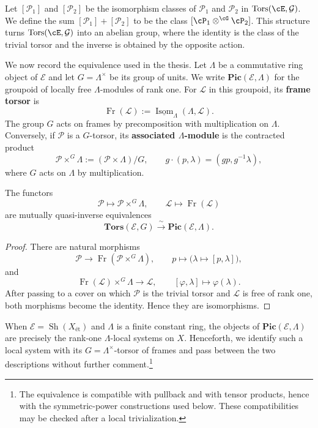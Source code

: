 Let $[\mathcal{P}_1]$ and $[\mathcal{P}_2]$ be the isomorphism classes of $\mathcal{P}_1$ and $\mathcal{P}_2$ in $\mathrm{Tors}(\cE, \mathcal{G})$.
We define the sum $[\mathcal{P}_1] + [\mathcal{P}_2]$ to be the class $[\cP_1 \otimes^{\cG} \cP_2]$.
This structure turns $\mathrm{Tors}(\cE, \mathcal{G})$ into an abelian group, 
where the identity is the class of the trivial torsor and the inverse is obtained by the opposite action.

We now record the equivalence used in the thesis.
Let $\Lambda$ be a commutative ring object of $\mathcal{E}$ and let
$G=\Lambda^\times$ be its group of units. We write
$\mathbf{Pic}(\mathcal{E},\Lambda)$ for the groupoid of locally free
$\Lambda$-modules of rank one. For $\mathcal{L}$ in this groupoid, its
\textbf{frame torsor} is
\[
\operatorname{Fr}(\mathcal{L})
  :=\underline{\operatorname{Isom}}_\Lambda(\Lambda,\mathcal{L}).
\]
The group $G$ acts on frames by precomposition with multiplication on $\Lambda$.
Conversely, if $\mathcal{P}$ is a $G$-torsor, its \textbf{associated
$\Lambda$-module} is the contracted product
\[
\mathcal{P}\times^G\Lambda
  :=(\mathcal{P}\times\Lambda)/G,
\qquad
g\cdot(p,\lambda)=(gp,g^{-1}\lambda),
\]
where $G$ acts on $\Lambda$ by multiplication.

\begin{prop}
\label{prop:torsor_module_equivalence}
The functors
\[
\mathcal{P}\longmapsto\mathcal{P}\times^G\Lambda,
\qquad
\mathcal{L}\longmapsto\operatorname{Fr}(\mathcal{L})
\]
are mutually quasi-inverse equivalences
\[
\mathbf{Tors}(\mathcal{E},G)
\xrightarrow{\ \sim\ }
\mathbf{Pic}(\mathcal{E},\Lambda).
\]
\end{prop}

\begin{proof}
There are natural morphisms
\[
\mathcal{P}\longrightarrow
\operatorname{Fr}(\mathcal{P}\times^G\Lambda),
\qquad
p\longmapsto\bigl(\lambda\longmapsto[p,\lambda]\bigr),
\]
and
\[
\operatorname{Fr}(\mathcal{L})\times^G\Lambda
\longrightarrow\mathcal{L},
\qquad
[\varphi,\lambda]\longmapsto\varphi(\lambda).
\]
After passing to a cover on which $\mathcal{P}$ is the trivial torsor and
$\mathcal{L}$ is free of rank one, both morphisms become the identity.
Hence they are isomorphisms.
\end{proof}

When $\mathcal{E}=\operatorname{Sh}(X_{\text{\'et}})$ and $\Lambda$
is a finite constant ring, the objects of
$\mathbf{Pic}(\mathcal{E},\Lambda)$ are precisely the rank-one
$\Lambda$-local systems on $X$. Henceforth, we identify such a local system
with its $G=\Lambda^\times$-torsor of frames and pass between the two
descriptions without further comment.\footnote{The equivalence is compatible
with pullback and with tensor products, hence with the symmetric-power
constructions used below. These compatibilities may be checked after a local
trivialization.}

